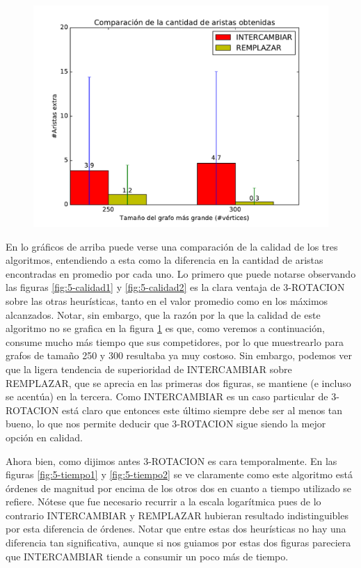 \begin{figure}[H]
\begin{minipage}{0.49\textwidth}
  \centering
    \includegraphics[width=1\textwidth]{graficos/problema_5/calidad4.pdf}
  \caption{}
  \label{fig:5-calidad3}
\end{minipage}%
\end{figure}

En lo gráficos de arriba puede verse una comparación de la calidad de los tres algoritmos, entendiendo a esta como la diferencia en la cantidad de aristas encontradas en promedio por cada uno. Lo primero que puede notarse observando las figuras \ref{fig:5-calidad1} y \ref{fig:5-calidad2} es la clara ventaja de 3-ROTACION sobre las otras heurísticas, tanto en el valor promedio como en los máximos alcanzados. Notar, sin embargo, que la razón por la que la calidad de este algoritmo no se grafica en la figura \ref{fig:5-calidad3} es que, como veremos a continuación, consume mucho más tiempo que sus competidores, por lo que muestrearlo para grafos de tamaño 250 y 300 resultaba ya muy costoso. Sin embargo, podemos ver que la ligera tendencia de superioridad de INTERCAMBIAR sobre REMPLAZAR, que se aprecia  en las primeras dos figuras, se mantiene (e incluso se acentúa) en la tercera. Como INTERCAMBIAR es un caso particular de 3-ROTACION está claro que entonces este último siempre debe ser al menos tan bueno, lo que nos permite deducir que 3-ROTACION sigue siendo la mejor opción en calidad.

Ahora bien, como dijimos antes 3-ROTACION es cara temporalmente. En las figuras \ref{fig:5-tiempo1} y \ref{fig:5-tiempo2} se ve claramente como este algoritmo está órdenes de magnitud por encima de los otros dos en cuanto a tiempo utilizado se refiere. Nótese que fue necesario recurrir a la escala logarítmica pues de lo contrario INTERCAMBIAR y REMPLAZAR hubieran resultado indistinguibles por esta diferencia de órdenes.  Notar que entre estas dos heurísticas no hay una diferencia tan significativa, aunque si nos guiamos por estas dos figuras pareciera que INTERCAMBIAR tiende a consumir un poco más de tiempo. 

